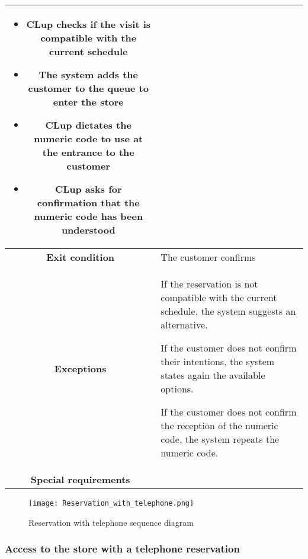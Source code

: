 \documentclass[../../main.tex]{subfiles}
\begin{document}
\begin{table}[H]
\begin{tabular}{c m{}}
\begin{itemize}
                                      \item CLup checks if the visit is compatible with the current schedule
                                      \item The system adds the customer to the queue to enter the store
                                      \item CLup dictates the numeric code to use at the entrance to the customer
                                      \item CLup asks for confirmation that the numeric code has been understood
                                    \end{itemize}\\ \hline
          \textbf{Exit condition} & The customer confirms \\ \hline
          \textbf{Exceptions} & If the reservation is not compatible with the current schedule, the system suggests an alternative.
          
                                If the customer does not confirm their intentions, the system states again the available options.
                                
                                If the customer does not confirm the reception of the numeric code, the system repeats the numeric code.\\ \hline
          \textbf{Special requirements} &\\ \hline
          \end{tabular}
      \end{table}

      \begin{figure}[H]
        \centering
        \texttt{[image: Reservation\_with\_telephone.png]}
        \caption{Reservation with telephone sequence diagram}
      \end{figure}

      \subsubsection{Access to the store with a telephone reservation}
\end{document}

